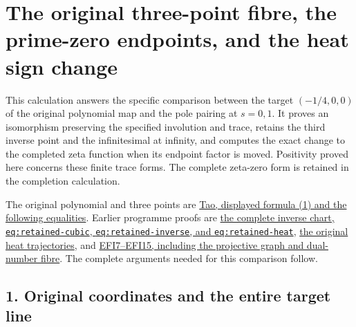 \documentclass[
  10pt,
  a4paper,
]{article}
\author{}
\date{}
\begin{document}
{
\setcounter{tocdepth}{3}
\tableofcontents
}
\section{The original three-point fibre, the prime-zero endpoints, and
the heat sign
change}\label{the-original-three-point-fibre-the-prime-zero-endpoints-and-the-heat-sign-change}

This calculation answers the specific comparison between the target
\((-1/4,0,0)\) of the original polynomial map and the pole pairing at
\(s=0,1\). It proves an isomorphism preserving the specified involution
and trace, retains the third inverse point and the infinitesimal at
infinity, and computes the exact change to the completed zeta function
when its endpoint factor is moved. Positivity proved here concerns these
finite trace forms. The complete zeta-zero form is retained in the
completion calculation.

The original polynomial and three points are
\href{https://terrytao.wordpress.com/2026/07/21/a-digestion-of-the-jacobian-conjecture-counterexample/}{Tao,
displayed formula (1) and the following equalities}. Earlier programme
proofs are
\href{https://github.com/KokunoYumeto/zeta-function-research-reader/blob/ac168d55cbb400a6c8926a00d67909ba65646ac5/satellites/23_source_mechanism_transfer.tex\#L45}{the
complete inverse chart, \texttt{eq:\allowbreak{}retained-\allowbreak{}cubic},
\texttt{eq:\allowbreak{}retained-\allowbreak{}inverse}, and \texttt{eq:\allowbreak{}retained-\allowbreak{}heat}},
\href{https://github.com/KokunoYumeto/zeta-function-research-reader/blob/ac168d55cbb400a6c8926a00d67909ba65646ac5/satellites/26_incompressible_fibre_heat.tex\#L389}{the
original heat trajectories}, and
\href{https://github.com/KokunoYumeto/zeta-function-research-reader/blob/173dbc6ed5a03235dbe7654f928f3692107db39b/workbenches/splitzero-tandem/branches/tau-zero-prime-positivity/ESCAPING_FIBRE_INFINITESIMAL_DERIVATION.md\#L89}{EFI7--EFI15,
including the projective graph and dual-number fibre}. The complete
arguments needed for this comparison follow.

\subsection{1. Original coordinates and the entire target
line}\label{original-coordinates-and-the-entire-target-line}
\end{document}
